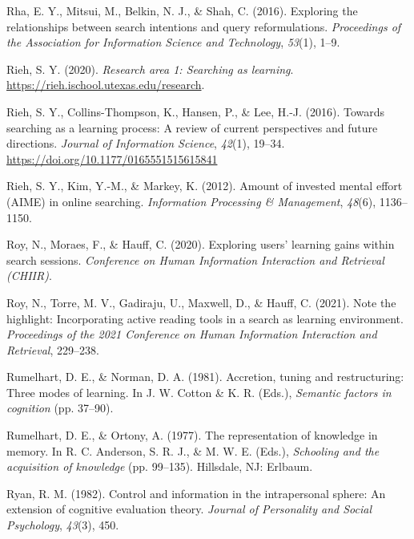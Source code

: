 \documentclass[letterpaper, nobind]{templates/ociamthesis}
\newlength{\cslhangindent}
\newenvironment{CSLReferences}[2] %
 {%
  \setlength{\parindent}{0pt}
  \ifodd #1
  \let\oldpar\par
  \def\par{\hangindent=\cslhangindent\oldpar}
  \fi
  \setlength{\parskip}{1mm}
  \setlength{\baselineskip}{6mm}
 }%
 {}
\begin{document}
\begin{CSLReferences}{1}{0}
\leavevmode{}%
Rha, E. Y., Mitsui, M., Belkin, N. J., \& Shah, C. (2016). Exploring the relationships between search intentions and query reformulations. \emph{Proceedings of the Association for Information Science and Technology}, \emph{53}(1), 1--9.

\leavevmode{}%
Rieh, S. Y. (2020). \emph{Research area 1: Searching as learning}. \url{https://rieh.ischool.utexas.edu/research}.

\leavevmode{}%
Rieh, S. Y., Collins-Thompson, K., Hansen, P., \& Lee, H.-J. (2016). Towards searching as a learning process: A review of current perspectives and future directions. \emph{Journal of Information Science}, \emph{42}(1), 19--34. \url{https://doi.org/10.1177/0165551515615841}

\leavevmode{}%
Rieh, S. Y., Kim, Y.-M., \& Markey, K. (2012). Amount of invested mental effort (AIME) in online searching. \emph{Information Processing \& Management}, \emph{48}(6), 1136--1150.

\leavevmode{}%
Roy, N., Moraes, F., \& Hauff, C. (2020). Exploring users' learning gains within search sessions. \emph{Conference on Human Information Interaction and Retrieval (CHIIR)}.

\leavevmode{}%
Roy, N., Torre, M. V., Gadiraju, U., Maxwell, D., \& Hauff, C. (2021). Note the highlight: Incorporating active reading tools in a search as learning environment. \emph{Proceedings of the 2021 Conference on Human Information Interaction and Retrieval}, 229--238.

\leavevmode{}%
Rumelhart, D. E., \& Norman, D. A. (1981). Accretion, tuning and restructuring: Three modes of learning. In J. W. Cotton \& K. R. (Eds.), \emph{Semantic factors in cognition} (pp. 37--90).

\leavevmode{}%
Rumelhart, D. E., \& Ortony, A. (1977). The representation of knowledge in memory. In R. C. Anderson, S. R. J., \& M. W. E. (Eds.), \emph{Schooling and the acquisition of knowledge} (pp. 99--135). Hillsdale, NJ: Erlbaum.

\leavevmode{}%
Ryan, R. M. (1982). Control and information in the intrapersonal sphere: An extension of cognitive evaluation theory. \emph{Journal of Personality and Social Psychology}, \emph{43}(3), 450.


\end{CSLReferences}
\end{document}
